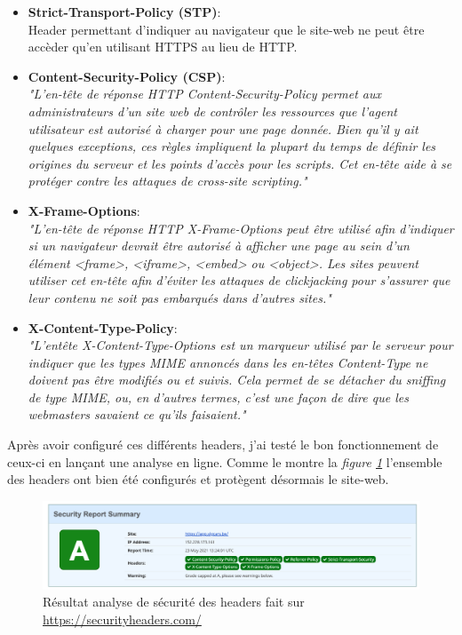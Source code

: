 \begin{itemize}
  \item \textbf{Strict-Transport-Policy (STP)}: \\ Header permettant d'indiquer au navigateur que le site-web ne peut être accèder qu'en utilisant HTTPS au lieu de HTTP. \\
  
  \item \textbf{Content-Security-Policy (CSP)}: \\ \textit{"L'en-tête de réponse HTTP Content-Security-Policy permet aux administrateurs d'un site web de contrôler les ressources que l'agent utilisateur est autorisé à charger pour une page donnée. Bien qu'il y ait quelques exceptions, ces règles impliquent la plupart du temps de définir les origines du serveur et les points d'accès pour les scripts. Cet en-tête aide à se protéger contre les attaques de cross-site scripting."}\cite{CSP} \\

  \item \textbf{X-Frame-Options}: \\ \textit{"L'en-tête de réponse HTTP X-Frame-Options peut être utilisé afin d'indiquer si un navigateur devrait être autorisé à afficher une page au sein d'un élément <frame>, <iframe>, <embed> ou <object>. Les sites peuvent utiliser cet en-tête afin d'éviter les attaques de clickjacking pour s'assurer que leur contenu ne soit pas embarqués dans d'autres sites."}\cite{X-Frame} \\

  \item \textbf{X-Content-Type-Policy}: \\ \textit{"L'entête X-Content-Type-Options est un marqueur utilisé par le serveur pour indiquer que les types MIME annoncés dans les en-têtes Content-Type ne doivent pas être modifiés ou et suivis. Cela permet de se détacher du sniffing de type MIME, ou, en d'autres termes, c'est une façon de dire que les webmasters savaient ce qu'ils faisaient."}\cite{X-Content}
\end{itemize}

\newpara

Après avoir configuré ces différents headers, j'ai testé le bon fonctionnement de ceux-ci en lançant une analyse en ligne. Comme le montre la \textit{figure \ref{Headers}} l'ensemble des headers ont bien été configurés et protègent désormais le site-web. 

\begin{figure}[H]
  \centering
  \includegraphics[width=\linewidth]{img/securityHeaders.png}
  \caption{Résultat analyse de sécurité des headers fait sur \url{https://securityheaders.com/}}
  \label{Headers}
\end{figure}


